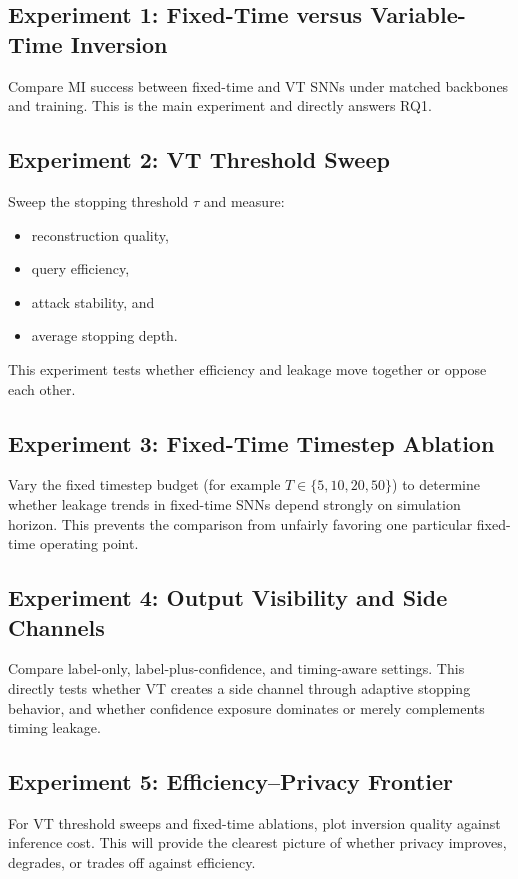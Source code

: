 \documentclass[11pt]{article}
\begin{document}
\subsection{Experiment 1: Fixed-Time versus Variable-Time Inversion}
Compare MI success between fixed-time and VT SNNs under matched backbones and training. This is the main experiment and directly answers RQ1.

\subsection{Experiment 2: VT Threshold Sweep}
Sweep the stopping threshold $\tau$ and measure:
\begin{itemize}[leftmargin=1.3em]
\item reconstruction quality,
\item query efficiency,
\item attack stability, and
\item average stopping depth.
\end{itemize}
This experiment tests whether efficiency and leakage move together or oppose each other.

\subsection{Experiment 3: Fixed-Time Timestep Ablation}
Vary the fixed timestep budget (for example $T \in \{5,10,20,50\}$) to determine whether leakage trends in fixed-time SNNs depend strongly on simulation horizon. This prevents the comparison from unfairly favoring one particular fixed-time operating point.

\subsection{Experiment 4: Output Visibility and Side Channels}
Compare label-only, label-plus-confidence, and timing-aware settings. This directly tests whether VT creates a side channel through adaptive stopping behavior, and whether confidence exposure dominates or merely complements timing leakage.

\subsection{Experiment 5: Efficiency--Privacy Frontier}
For VT threshold sweeps and fixed-time ablations, plot inversion quality against inference cost. This will provide the clearest picture of whether privacy improves, degrades, or trades off against efficiency.
\end{document}
